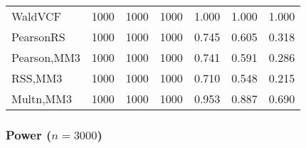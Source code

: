 \documentclass[
]{article}
\begin{document}
\begin{table}[H]
{\begin{tabular}[t]{lrrrrrr}
\hspace{1em}WaldVCF & 1000 & 1000 & 1000 & 1.000 & 1.000 & 1.000\\
\hspace{1em}PearsonRS & 1000 & 1000 & 1000 & 0.745 & 0.605 & 0.318\\
\hspace{1em}Pearson,MM3 & 1000 & 1000 & 1000 & 0.741 & 0.591 & 0.286\\
\hspace{1em}RSS,MM3 & 1000 & 1000 & 1000 & 0.710 & 0.548 & 0.215\\
\hspace{1em}Multn,MM3 & 1000 & 1000 & 1000 & 0.953 & 0.887 & 0.690\\
\bottomrule
\end{tabular}}
\endgroup{}
\end{table}

\hypertarget{power-n3000-3}{%
\subsubsection{\texorpdfstring{Power
(\(n=3000\))}{Power (n=3000)}}\label{power-n3000-3}}
\end{document}
